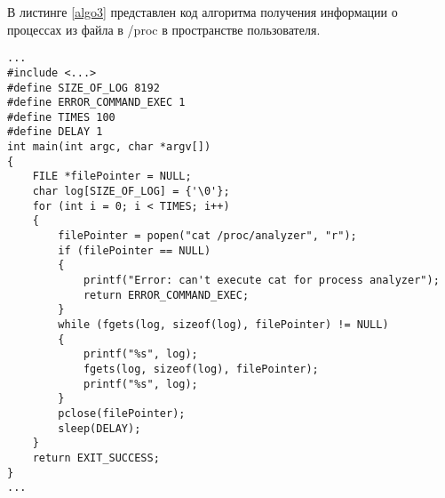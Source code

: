 В листинге \ref{algo3} представлен код алгоритма получения информации о процессах из файла в /proc в пространстве пользователя.
\begin{lstlisting}[label=algo3,caption=Реализация алгоритма получения информации о процессах из файла в /proc в пространстве пользователя]
...
#include <...>
#define SIZE_OF_LOG 8192
#define ERROR_COMMAND_EXEC 1
#define TIMES 100
#define DELAY 1
int main(int argc, char *argv[])
{
    FILE *filePointer = NULL;
    char log[SIZE_OF_LOG] = {'\0'};
    for (int i = 0; i < TIMES; i++)
    {
        filePointer = popen("cat /proc/analyzer", "r");
        if (filePointer == NULL)
        {
            printf("Error: can't execute cat for process analyzer");
            return ERROR_COMMAND_EXEC;
        }
        while (fgets(log, sizeof(log), filePointer) != NULL)
        {
            printf("%s", log);
            fgets(log, sizeof(log), filePointer);
            printf("%s", log);
        }
        pclose(filePointer);
        sleep(DELAY);
    }
    return EXIT_SUCCESS;
}
...
\end{lstlisting}

